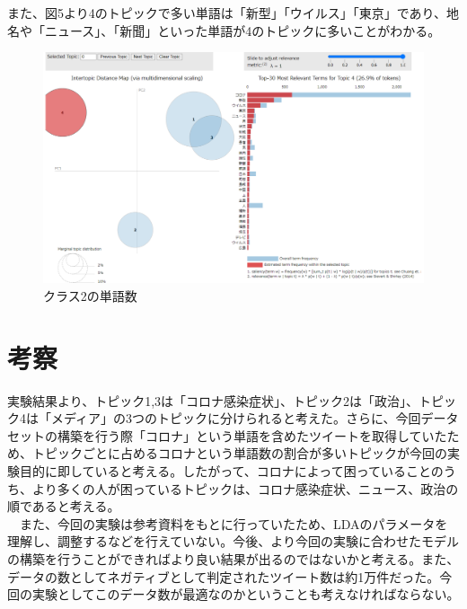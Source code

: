 \documentclass[a4paper, 11pt, titlepage]{jsarticle}
\begin{document}
また、図5より4のトピックで多い単語は「新型」「ウイルス」「東京」であり、地名や「ニュース」、「新聞」といった単語が4のトピックに多いことがわかる。\\
\begin{figure}[H]
  \centering
  \includegraphics[scale=0.25]{picture5.png}
  \caption{クラス2の単語数}
\end{figure}

\section{考察}
実験結果より、トピック1,3は「コロナ感染症状」、トピック2は「政治」、トピック4は「メディア」の3つのトピックに分けられると考えた。さらに、今回データセットの構築を行う際「コロナ」という単語を含めたツイートを取得していたため、トピックごとに占めるコロナという単語数の割合が多いトピックが今回の実験目的に即していると考える。したがって、コロナによって困っていることのうち、より多くの人が困っているトピックは、コロナ感染症状、ニュース、政治の順であると考える。\\

　また、今回の実験は参考資料をもとに行っていたため、LDAのパラメータを理解し、調整するなどを行えていない。今後、より今回の実験に合わせたモデルの構築を行うことができればより良い結果が出るのではないかと考える。また、データの数としてネガティブとして判定されたツイート数は約1万件だった。今回の実験としてこのデータ数が最適なのかということも考えなければならない。
\end{document}
